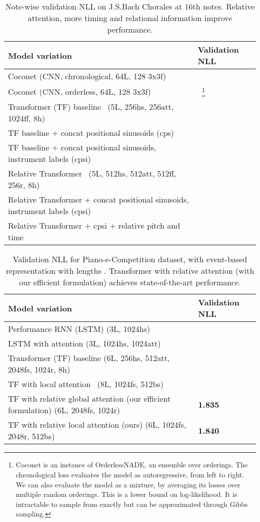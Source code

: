 \documentclass{article} \usepackage{iclr2019_conference,times}
\begin{document}
\begin{savenotes}
\begin{table}[h]
  \caption{Note-wise validation NLL on J.S.Bach Chorales at 16th notes.  Relative attention, more timing and relational information improve performance.}
  \label{bach_nll}
  \centering
  \begin{tabular}{ll}
    \toprule
    Model variation     & Validation NLL      \\
    \midrule
    {\sc Coconet} (CNN, chronological, 64L, 128 3x3f) &   \\
    {\sc Coconet} (CNN, orderless, 64L, 128 3x3f) &  ~\footnote{{\sc Coconet} is an instance of OrderlessNADE, an ensemble over orderings.  The chronological loss evaluates the model as autoregressive, from left to right.  We can also evaluate the model as a mixture, by averaging its losses over multiple random orderings.  This is a lower bound on log-likelihood.  It is intractable to sample from exactly but can be approximated through Gibbs sampling.} \\
    \midrule
Transformer (TF) baseline~\citep{vaswani2017attention} (5L, 256hs, 256att, 1024ff, 8h) &  \\
TF baseline + concat positional sinusoids (cps) &  \\
    TF baseline + concat positional sinusoids, instrument labels (cpsi) &  \\
\midrule
    Relative Transformer~\citep{shaw2018self} (5L, 512hs, 512att, 512ff, 256r, 8h) &  \\
Relative Transformer + concat positional sinusoids, instrument labels (cpsi)  &  \\
Relative Transformer + cpsi + relative pitch and time&  \\
    \bottomrule
  \end{tabular}
\end{table}
\end{savenotes}

\begin{table}[h]
  \caption{Validation NLL for Piano-e-Competition dataset, with event-based representation with lengths .  Transformer with relative attention (with our efficient formulation) achieves state-of-the-art performance.}
  \label{performance_nll}
  \centering
  \begin{tabular}{ll}
    \toprule
    Model variation     & Validation NLL      \\
    \midrule
   {\sc Performance RNN} (LSTM) (3L, 1024hs)  &  \\ 
   LSTM with attention (3L, 1024hs, 1024att) & \\
   \midrule
    Transformer (TF) baseline (6L, 256hs, 512att, 2048fs, 1024r, 8h) &  \\
    TF with local attention~\citep{liu2018generatin} (8L, 1024fs, 512bs) &  \\
    TF with relative global attention (our efficient formulation) (6L, 2048fs, 1024r) & \textbf{1.835} \\
TF with relative local attention (ours) (6L, 1024fs, 2048r, 512bs) & \textbf{1.840}\\
\bottomrule
  \end{tabular}
\end{table}
\end{document}
